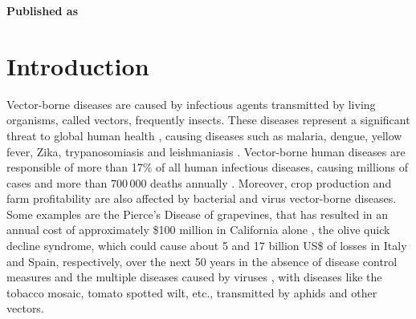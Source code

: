 \vspace{3cm}






\textbf{Published as}

\vspace{0.5cm}


\newpage
\section{Introduction}\label{sec:intro}

Vector-borne diseases are caused by infectious agents transmitted by living
organisms, called vectors,  frequently insects. These diseases represent a
significant threat to global human health \cite{Athni_2020}, causing diseases
such as malaria, dengue, yellow fever, Zika, trypanosomiasis and leishmaniasis
\cite{SCHUMACHER2018352}. Vector-borne human diseases are responsible of more
than 17\% of all human infectious diseases, causing millions of cases and more
than $700\,000$ deaths annually \cite{WHO}. Moreover, crop production and farm
profitability are also affected by bacterial \cite{HUANG20201379} and virus
\cite{Bragard2013} vector-borne diseases. Some examples are the Pierce's
Disease of grapevines, that has resulted in an annual cost of approximately
\$100 million in California alone \cite{tumber2014pierce}, the olive quick
decline syndrome, which could cause about 5 and 17 billion US\$ of losses in
Italy and Spain, respectively, over the next 50 years in the absence of disease
control measures \cite{Schneider2020} and the multiple diseases caused by
viruses \cite{Rybicki2015}, with diseases like the tobacco mosaic, tomato
spotted wilt, etc., transmitted by aphids and other vectors.


